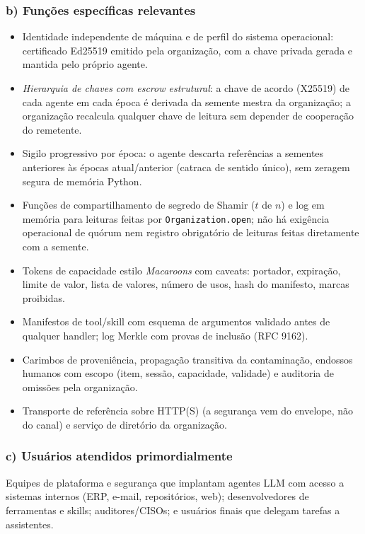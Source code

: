 \documentclass[11pt,a4paper]{article}
\theoremstyle{plain}
\theoremstyle{definition}
\theoremstyle{remark}
\newcommand{\cod}[1]{\texttt{#1}}
\begin{document}
\subsubsection*{b) Funções específicas relevantes}
\begin{itemize}
  \item Identidade independente de máquina e de perfil do sistema operacional: certificado Ed25519 emitido pela organização, com a chave privada gerada e mantida pelo próprio agente.
  \item \emph{Hierarquia de chaves com escrow estrutural}: a chave de acordo (X25519) de cada agente em cada época é derivada da semente mestra da organização; a organização recalcula qualquer chave de leitura sem depender de cooperação do remetente.
  \item Sigilo progressivo por época: o agente descarta referências a sementes anteriores às épocas atual/anterior (catraca de sentido único), sem zeragem segura de memória Python.
  \item Funções de compartilhamento de segredo de Shamir ($t$ de $n$) e log em memória para leituras feitas por \cod{Organization.open}; não há exigência operacional de quórum nem registro obrigatório de leituras feitas diretamente com a semente.
  \item Tokens de capacidade estilo \emph{Macaroons} com caveats: portador, expiração, limite de valor, lista de valores, número de usos, hash do manifesto, marcas proibidas.
  \item Manifestos de tool/skill com esquema de argumentos validado antes de qualquer handler; log Merkle com provas de inclusão (RFC 9162).
  \item Carimbos de proveniência, propagação transitiva da contaminação, endossos humanos com escopo (item, sessão, capacidade, validade) e auditoria de omissões pela organização.
  \item Transporte de referência sobre HTTP(S) (a segurança vem do envelope, não do canal) e serviço de diretório da organização.
\end{itemize}

\subsubsection*{c) Usuários atendidos primordialmente}
Equipes de plataforma e segurança que implantam agentes LLM com acesso a sistemas internos (ERP, e-mail, repositórios, web); desenvolvedores de ferramentas e skills; auditores/CISOs; e usuários finais que delegam tarefas a assistentes.
\end{document}
